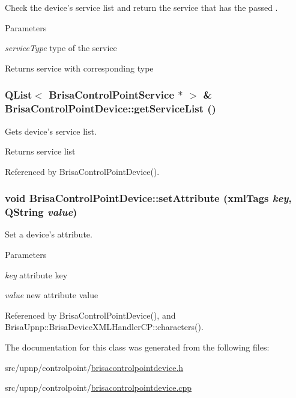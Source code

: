 Check the device's service list and return the service that has the passed . 
\begin{DoxyParams}{Parameters}
\item[{\em serviceType}]type of the service \end{DoxyParams}
\begin{DoxyReturn}{Returns}
service with corresponding type 
\end{DoxyReturn}
\hypertarget{classBrisaUpnp_1_1BrisaControlPointDevice_a869e15a65859b2f576cc33e1735ff72f}{
\subsubsection[{getServiceList}]{\setlength{\rightskip}{0pt plus 5cm}QList$<$ {\bf BrisaControlPointService} $\ast$ $>$ \& BrisaControlPointDevice::getServiceList ()}}
\label{classBrisaUpnp_1_1BrisaControlPointDevice_a869e15a65859b2f576cc33e1735ff72f}


Gets device's service list. \begin{DoxyReturn}{Returns}
service list 
\end{DoxyReturn}


Referenced by BrisaControlPointDevice().\hypertarget{classBrisaUpnp_1_1BrisaControlPointDevice_ab0922df951a94339f371b285c04eabac}{
\subsubsection[{setAttribute}]{\setlength{\rightskip}{0pt plus 5cm}void BrisaControlPointDevice::setAttribute ({\bf xmlTags} {\em key}, \/  QString {\em value})}}
\label{classBrisaUpnp_1_1BrisaControlPointDevice_ab0922df951a94339f371b285c04eabac}


Set a device's attribute. 
\begin{DoxyParams}{Parameters}
\item[{\em key}]attribute key \item[{\em value}]new attribute value \end{DoxyParams}


Referenced by BrisaControlPointDevice(), and BrisaUpnp::BrisaDeviceXMLHandlerCP::characters().

The documentation for this class was generated from the following files:\begin{DoxyCompactItemize}
\item 
src/upnp/controlpoint/\hyperlink{brisacontrolpointdevice_8h}{brisacontrolpointdevice.h}\item 
src/upnp/controlpoint/\hyperlink{brisacontrolpointdevice_8cpp}{brisacontrolpointdevice.cpp}\end{DoxyCompactItemize}
